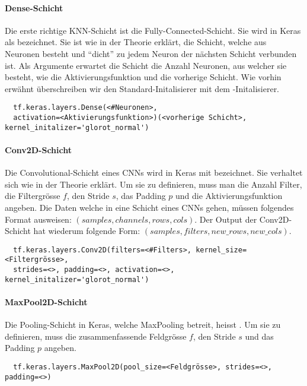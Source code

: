 \paragraph{Dense-Schicht}
Die erste richtige KNN-Schicht ist die Fully-Connected-Schicht. Sie wird in
Keras als  bezeichnet. Sie ist wie in
der Theorie erklärt, die Schicht, welche aus Neuronen besteht und ``dicht'' zu jedem
Neuron der nächsten Schicht verbunden ist.
Als Argumente erwartet die Schicht die Anzahl Neuronen, aus welcher sie besteht,
wie die Aktivierungsfunktion und die vorherige Schicht. Wie vorhin erwähnt
überschreiben wir den Standard-Initalisierer mit dem -Initalisierer.
\begin{verbatim}
  tf.keras.layers.Dense(<#Neuronen>,
  activation=<Aktivierungsfunktion>)(<vorherige Schicht>, kernel_initalizer='glorot_normal')
\end{verbatim}

\paragraph{Conv2D-Schicht}
Die Convolutional-Schicht eines CNNs wird in Keras mit 
bezeichnet. Sie verhaltet sich wie in der Theorie erklärt. Um sie zu definieren,
muss man die Anzahl Filter, die Filtergrösse $f$, den Stride $s$, das Padding
$p$ und die Aktivierungsfunktion angeben.
Die Daten welche in eine Schicht eines CNNs gehen, müssen
folgendes Format ausweisen: $(samples, channels, rows, cols)$. Der Output der
Conv2D-Schicht hat wiederum folgende Form: $(samples, filters, new\_rows, new\_cols)$.
\begin{verbatim}
  tf.keras.layers.Conv2D(filters=<#Filters>, kernel_size=<Filtergrösse>,
  strides=<>, padding=<>, activation=<>, kernel_initalizer='glorot_normal')
\end{verbatim}

\paragraph{MaxPool2D-Schicht}
Die Pooling-Schicht in Keras, welche MaxPooling betreit, heisst
. Um sie zu definieren, muss die zusammenfassende Feldgrösse
$f$, den Stride $s$ und das Padding $p$ angeben.

\begin{verbatim}
  tf.keras.layers.MaxPool2D(pool_size=<Feldgrösse>, strides=<>, padding=<>)
\end{verbatim}

